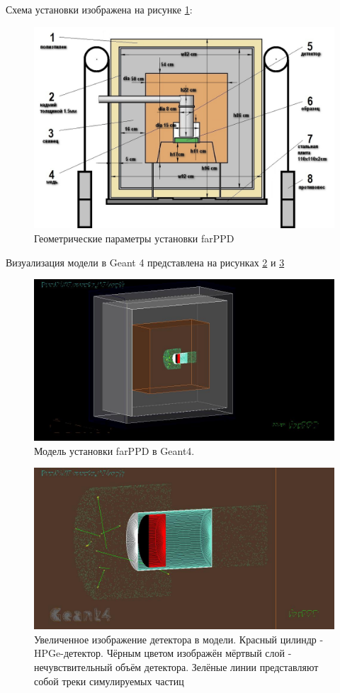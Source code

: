 \documentclass[a4paper,article,14pt]{extarticle}
\begin{document}
Схема установки изображена на рисунке \ref{geom}:

\begin{figure}[h]
    \centering
    \includegraphics[width = 0.85 \textwidth]{images/farPPD_size.jpg}
    \caption{Геометрические параметры установки farPPD}
    \label{geom}
\end{figure}

Визуализация модели в Geant 4 представлена на рисунках \ref{vis} и \ref{tracks}

\begin{figure}[h]
    \centering
    \includegraphics[width = 0.85 \textwidth]{images/Visualisation.jpg}
    \caption{Модель установки farPPD в Geant4. }
    \label{vis}
\end{figure}

\begin{figure}[h!]
    \centering
    \includegraphics[width = 0.85 \textwidth]{images/Tracks.jpg}
    \caption{Увеличенное изображение детектора в модели. Красный цилиндр - HPGe-детектор. Чёрным цветом изображён мёртвый слой - нечувствительный объём детектора. Зелёные линии представляют собой треки симулируемых частиц}
    \label{tracks}
\end{figure}
\end{document}
